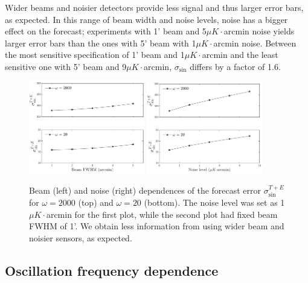 \documentclass[a4paper,12pt,times,custombib,print,index]{Classes/PhDThesisPSnPDF} %
\providecommand{\DIFadd}[1]{{\protect\color{blue}\uwave{#1}}} %
\providecommand{\DIFaddFL}[1]{\DIFadd{#1}} %
\providecommand{\DIFaddbeginFL}{} %
\providecommand{\DIFaddendFL}{} %
\newcommand{\DIFaddincludegraphics}[2][]{{\color{blue}\fbox{\DIFOincludegraphics[#1]{#2}}}} %
\DeclareRobustCommand{\DIFaddbeginFL}{\DIFOaddbeginFL \let\includegraphics\DIFaddincludegraphics} %
\DeclareRobustCommand{\DIFaddendFL}{\DIFOaddendFL \let\includegraphics\DIFOincludegraphics} %
\begin{document}
Wider beams and noisier detectors provide less signal and thus larger error bars, as expected. In this range of beam width and noise levels, noise has a bigger effect on the forecast; experiments with 1' beam and 5$\mu K\cdot$arcmin noise yields larger error bars than the ones with 5' beam with 1$\mu K\cdot$arcmin noise. Between the most sensitive specification of 1' beam and 1$\mu K\cdot$arcmin and the least sensitive one with 5' beam and 9$\mu K\cdot$arcmin, $\sigma_{\sin}$ differs by a factor of 1.6.


\begin{figure}[ht]
	\centering
	\includegraphics[width=0.45\textwidth]{beam_dependence.pdf}
	\includegraphics[width=0.45\textwidth]{noise_dependence.pdf}
	\caption{Beam (left) and noise (right) dependences of the forecast error $\sigma_{\sin}^{T+E}$ for $\omega=2000$ (top) and $\omega=20$ (bottom). The noise level was set as 1$\mu K \cdot$arcmin for the first plot, while the second plot had \DIFaddbeginFL \DIFaddFL{a }\DIFaddendFL fixed beam FWHM of 1'. We obtain less information from using wider beam and noisier sensors, as expected.}
	\label{forecast beam and noise dependence}
\end{figure}

\subsection{Oscillation frequency dependence}
\end{document}
